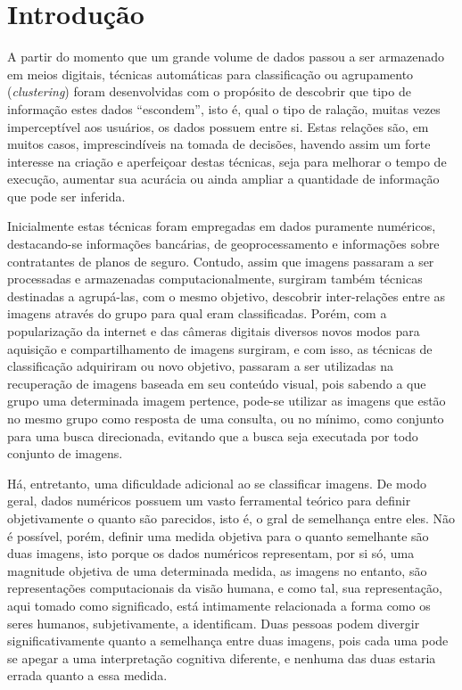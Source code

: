 \chapter{Introdução}

A partir do momento que um grande volume de dados passou a ser armazenado em
meios digitais, técnicas automáticas para classificação ou agrupamento
(\textit{clustering}) foram desenvolvidas com o propósito de descobrir que tipo
de informação estes dados “escondem”, isto é, qual o tipo de ralação, muitas
vezes imperceptível aos usuários, os dados possuem entre si. Estas relações são,
em muitos casos, imprescindíveis na tomada de decisões, havendo assim um forte
interesse na criação e aperfeiçoar destas técnicas, seja para melhorar o tempo
de execução,  aumentar sua acurácia ou ainda ampliar a quantidade de informação
que pode ser inferida.

Inicialmente estas técnicas foram empregadas em dados puramente numéricos,
destacando-se informações bancárias, de geoprocessamento e informações sobre
contratantes de planos de seguro. Contudo, assim que imagens passaram a ser
processadas e armazenadas computacionalmente, surgiram também técnicas
destinadas a agrupá-las, com o mesmo objetivo, descobrir inter-relações entre
as imagens através do grupo para qual eram classificadas. Porém, com a
popularização da internet e das câmeras digitais diversos novos modos para
aquisição e compartilhamento de imagens surgiram, e com isso, as técnicas de
classificação adquiriram ou novo objetivo, passaram a ser utilizadas na
recuperação de imagens baseada em seu conteúdo visual, pois sabendo a que grupo
uma determinada imagem pertence, pode-se utilizar as imagens que estão no mesmo
grupo como resposta de uma consulta, ou no mínimo, como conjunto para uma busca
direcionada, evitando que a busca seja executada por todo conjunto de imagens.

Há, entretanto, uma dificuldade adicional ao se classificar imagens. De modo
geral, dados numéricos possuem um vasto ferramental teórico para definir
objetivamente o quanto são parecidos, isto é, o gral de semelhança entre eles.
Não é possível, porém, definir uma medida objetiva para o quanto semelhante são
duas imagens, isto porque os dados numéricos representam, por si só, uma
magnitude objetiva de uma determinada medida, as imagens no entanto, são
representações computacionais da visão humana, e como tal, sua representação,
aqui tomado como significado, está intimamente relacionada a forma como os
seres humanos, subjetivamente, a identificam. Duas pessoas podem divergir
significativamente quanto a semelhança entre duas imagens, pois cada uma pode
se apegar a uma interpretação cognitiva diferente, e nenhuma das duas estaria
errada quanto a essa medida.

